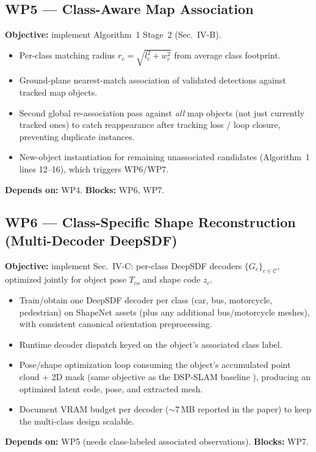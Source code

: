\documentclass[11pt]{article}
\begin{document}
\subsection*{WP5 --- Class-Aware Map Association}
\textbf{Objective:} implement Algorithm~1 Stage~2 (Sec.~IV-B).
\begin{itemize}[nosep]
  \item Per-class matching radius $r_c = \sqrt{l_c^2 + w_c^2}$ from average class footprint.
  \item Ground-plane nearest-match association of validated detections against tracked map objects.
  \item Second global re-association pass against \emph{all} map objects (not just currently tracked ones) to catch reappearance after tracking loss / loop closure, preventing duplicate instances.
  \item New-object instantiation for remaining unassociated candidates (Algorithm~1 lines 12--16), which triggers WP6/WP7.
\end{itemize}
\textbf{Depends on:} WP4. \textbf{Blocks:} WP6, WP7.

\subsection*{WP6 --- Class-Specific Shape Reconstruction (Multi-Decoder DeepSDF)}
\textbf{Objective:} implement Sec.~IV-C: per-class DeepSDF \cite{park2019deepsdf} decoders $\{G_c\}_{c\in\mathcal{C}}$, optimized jointly for object pose $T_{co}$ and shape code $z_c$.
\begin{itemize}[nosep]
  \item Train/obtain one DeepSDF decoder per class (car, bus, motorcycle, pedestrian) on ShapeNet \cite{chang2015shapenet} assets (plus any additional bus/motorcycle meshes), with consistent canonical orientation preprocessing.
  \item Runtime decoder dispatch keyed on the object's associated class label.
  \item Pose/shape optimization loop consuming the object's accumulated point cloud + 2D mask (same objective as the DSP-SLAM baseline \cite{wang2021dspslam}), producing an optimized latent code, pose, and extracted mesh.
  \item Document VRAM budget per decoder ($\sim$7\,MB reported in the paper) to keep the multi-class design scalable.
\end{itemize}
\textbf{Depends on:} WP5 (needs class-labeled associated observations). \textbf{Blocks:} WP7.
\end{document}
